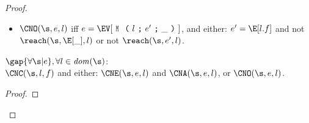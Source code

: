 \begin{proof}
\begin{itemize}
\item $\CNO(\s, e, l)$ iff $e = \EV[\M{l}{e'}{\_}]$, and either:
\qindent $e' = \E[l.f]$ and not $\reach(\s, \E[\_], l)$ or 
\qindent not $\reach(\s, e', l)$.

\end{itemize}

\begin{theorem}\rm
$\gap{\forall \s|e},\forall l \in \mathit{dom}(\s)$:\\
\indent $\CNC(\s, l, f)$ and either:
\qindent $\CNE(\s, e, l)$ and $\CNA(\s, e, l)$, or
\qindent $\CNO(\s, e, l)$.
\end{theorem}
\begin{proof}
\end{proof}
\end{proof}
